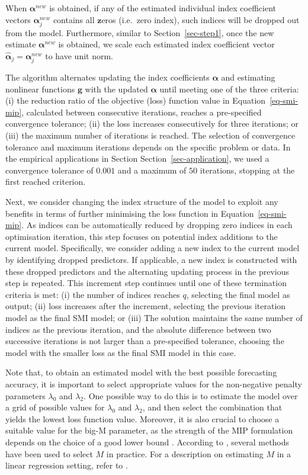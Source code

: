 \documentclass[11pt,a4paper,]{article}
\begin{document}
When \(\bm{\alpha}^{new}\) is obtained, if any of the estimated
individual index coefficient vectors \(\bm{\alpha}_{j}^{new}\) contains
all \(\bm{z}\)eros (i.e.~zero index), such indices will be dropped out
from the model. Furthermore, similar to Section~\ref{sec-step1}, once
the new estimate \(\bm{\alpha}^{new}\) is obtained, we scale each
estimated index coefficient vector
\(\hat{\bm{\alpha}}_{j} = \bm{\alpha}_{j}^{new}\) to have unit norm.

The algorithm alternates updating the index coefficients \(\bm{\alpha}\)
and estimating nonlinear functions \(\bm{g}\) with the updated
\(\bm{\alpha}\) until meeting one of the three criteria: (i) the
reduction ratio of the objective (loss) function value in
Equation~\ref{eq-smi-mip}, calculated between consecutive iterations,
reaches a pre-specified convergence tolerance; (ii) the loss increases
consecutively for three iterations; or (iii) the maximum number of
iterations is reached. The selection of convergence tolerance and
maximum iterations depends on the specific problem or data. In the
empirical applications in Section Section~\ref{sec-application}, we used
a convergence tolerance of \(0.001\) and a maximum of \(50\) iterations,
stopping at the first reached criterion.

Next, we consider changing the index structure of the model to exploit
any benefits in terms of further minimising the loss function in
Equation~\ref{eq-smi-mip}. As indices can be automatically reduced by
dropping zero indices in each optimisation iteration, this step focuses
on potential index additions to the current model. Specifically, we
consider adding a new index to the current model by identifying dropped
predictors. If applicable, a new index is constructed with these dropped
predictors and the alternating updating process in the previous step is
repeated. This increment step continues until one of these termination
criteria is met: (i) the number of indices reaches \(q\), selecting the
final model as output; (ii) loss increases after the increment,
selecting the previous iteration model as the final SMI model; or (iii)
The solution maintains the same number of indices as the previous
iteration, and the absolute difference between two successive iterations
is not larger than a pre-specified tolerance, choosing the model with
the smaller loss as the final SMI model in this case.

Note that, to obtain an estimated model with the best possible
forecasting accuracy, it is important to select appropriate values for
the non-negative penalty parameters \(\lambda_{0}\) and \(\lambda_{2}\).
One possible way to do this is to estimate the model over a grid of
possible values for \(\lambda_{0}\) and \(\lambda_{2}\), and then select
the combination that yields the lowest loss function value. Moreover, it
is also crucial to choose a suitable value for the big-M parameter, as
the strength of the MIP formulation depends on the choice of a good
lower bound \autocite{Bertsimas2016}. According to
\textcite{Hazimeh2023}, several methods have been used to select \(M\)
in practice. For a description on estimating \(M\) in a linear
regression setting, refer to \textcite{Bertsimas2016}.
\end{document}
